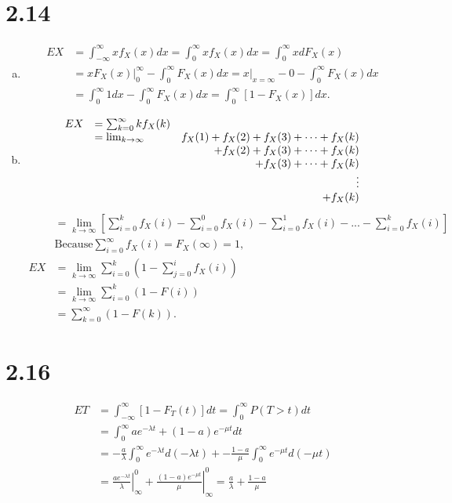 \documentclass[letter]{article}
\newcommand{\fx}{f_X(x)}
\newcommand{\intii}{\int_{-\infty}^\infty}
\begin{document}
    \section*{2.14}
    \begin{enumerate}[(a)]
    \item \begin{align*}
    EX & = \intii x \fx dx = \int_0^\infty x \fx dx = \int_0^\infty x d F_X(x) \\
    & = \left.xF_X(x)\right|^\infty_0 - \int_0^\infty F_X(x) dx
    = x|_{x=\infty} - 0 - \int_0^\infty F_X(x) dx \\
    & = \int_0^\infty 1 dx - \int_0^\infty F_X(x) dx  = \int_0^\infty \left[1-F_X(x)\right] dx.
    \end{align*}
    \item \[
    \begin{array}{c l r}
    EX & = \sum_{k=0}^\infty k f_X(k) & \\
    & = \lim_{k \to \infty} & f_X(1) + f_X(2) + f_X(3) + \dots + f_X(k) \\
    & & + f_X(2) + f_X(3) + \dots + f_X(k) \\
    & & + f_X(3) + \dots + f_X(k) \\
    & & \vdots \\
    & & + f_X(k) \\
    \end{array}
    \]
    \begin{align*}
    & = \lim_{k \to \infty} \left[ \sum_{i=0}^k f_X(i) - \sum_{i=0}^0 f_X(i)
    -\sum_{i=0}^1f_X(i) - ... - \sum_{i=0}^k f_X(i) \right] \\
    & \text{Because} \sum_{i=0}^\infty f_X(i) = F_X(\infty) = 1, \\
    EX & = \lim_{k \to \infty} \sum_{i=0}^k \left( 1 - \sum_{j=0}^i f_X(i) \right) & & & \\
    & = \lim_{k \to \infty} \sum_{i=0}^k (1-F(i)) \\
    & = \sum_{k=0}^\infty (1-F(k)). 
    \end{align*}
    \end{enumerate}

    \section*{2.16}
    \begin{align*}
    E T & = \int_{-\infty}^\infty [1-F_T(t)]dt = \int_0^\infty P(T>t) dt \\
    & = \int_0^\infty ae^{-\lambda t} + (1-a)e^{-\mu t}dt \\
    & = -\frac{a}{\lambda} \int_0^\infty e^{-\lambda t} d (-\lambda t) + 
    - \frac{1-a}{\mu} \int_0^\infty e^{-\mu t} d(-\mu t) \\
    & = \left. \frac{a e^{-\lambda t}}{\lambda}\right|^0_\infty + 
    \left. \frac{(1-a)e^{-\mu t}}{\mu}\right|^0_\infty = \frac{a}{\lambda} + \frac{1-a}{\mu}
    \end{align*}
\end{document}

